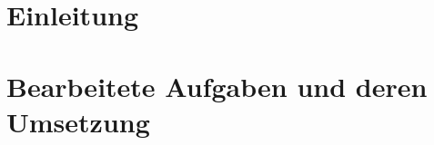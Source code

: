 \documentclass[
    a4paper,
    12pt,
    oneside,
    headings=normal,
    listof=totoc,
    bibliography=totoc,
    captions=tableheading,
    numbers=noenddot,
    parskip=half
]{scrreprt}
\begin{document}


\cleardoublepage
{}

\cleardoublepage
{}
\tableofcontents

\cleardoublepage
\listoffigures

\cleardoublepage
\lstlistoflistings

\cleardoublepage


\cleardoublepage
{}

\chapter{Einleitung}
\label{chap:introduction}


\chapter{Bearbeitete Aufgaben und deren Umsetzung}
\label{chap:tasks}

\end{document}
